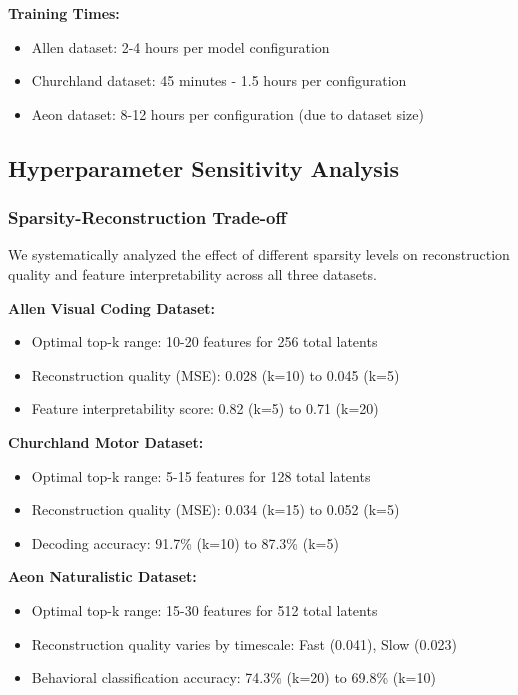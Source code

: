 \textbf{Training Times:}
\begin{itemize}
\item Allen dataset: 2-4 hours per model configuration
\item Churchland dataset: 45 minutes - 1.5 hours per configuration
\item Aeon dataset: 8-12 hours per configuration (due to dataset size)
\end{itemize}

\subsection{Hyperparameter Sensitivity Analysis}

\subsubsection{Sparsity-Reconstruction Trade-off}

We systematically analyzed the effect of different sparsity levels on reconstruction quality and feature interpretability across all three datasets.

\textbf{Allen Visual Coding Dataset:}
\begin{itemize}
\item Optimal top-k range: 10-20 features for 256 total latents
\item Reconstruction quality (MSE): 0.028 (k=10) to 0.045 (k=5)
\item Feature interpretability score: 0.82 (k=5) to 0.71 (k=20)
\end{itemize}

\textbf{Churchland Motor Dataset:}
\begin{itemize}
\item Optimal top-k range: 5-15 features for 128 total latents
\item Reconstruction quality (MSE): 0.034 (k=15) to 0.052 (k=5)
\item Decoding accuracy: 91.7\% (k=10) to 87.3\% (k=5)
\end{itemize}

\textbf{Aeon Naturalistic Dataset:}
\begin{itemize}
\item Optimal top-k range: 15-30 features for 512 total latents
\item Reconstruction quality varies by timescale: Fast (0.041), Slow (0.023)
\item Behavioral classification accuracy: 74.3\% (k=20) to 69.8\% (k=10)
\end{itemize}

